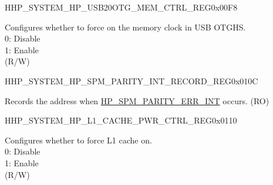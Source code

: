 \begin{register}{H}{HP\_SYSTEM\_HP\_USB20OTG\_MEM\_CTRL\_REG}{0x00F8}\label{regdesc:HPSYSTEMHPUSB20OTGMEMCTRLREG}
%
%
\regnewline%
\begin{regdesc}\begin{reglist}
\label{fielddesc:HPSYSTEMUSB20MEMCLKFORCEON}\item [HP\_SYSTEM\_USB20\_MEM\_CLK\_FORCE\_ON] Configures whether to force on the memory clock in USB OTGHS. \\
0: Disable\\
1: Enable\\
(R/W)
\end{reglist}\end{regdesc}
\end{register}


\begin{register}{H}{HP\_SYSTEM\_HP\_SPM\_PARITY\_INT\_RECORD\_REG}{0x010C}\label{regdesc:HPSYSTEMHPSPMPARITYINTRECORDREG}
%
%
\regnewline%
\begin{regdesc}\begin{reglist}
\label{fielddesc:HPSYSTEMHPSPMPARITYERRINTADDR}\item [HP\_SYSTEM\_HP\_SPM\_PARITY\_ERR\_INT\_ADDR] Records the address when \hyperref[tab:sysreg-int-sources]{HP\_SPM\_PARITY\_ERR\_INT} occurs. (RO)
\end{reglist}\end{regdesc}
\end{register}


\begin{register}{H}{HP\_SYSTEM\_HP\_L1\_CACHE\_PWR\_CTRL\_REG}{0x0110}\label{regdesc:HPSYSTEMHPL1CACHEPWRCTRLREG}
%
%
\regnewline%
\begin{regdesc}\begin{reglist}
\label{fielddesc:HPSYSTEML1CACHEMEMFO}\item [HP\_SYSTEM\_L1\_CACHE\_MEM\_FO] Configures whether to force L1 cache on.\\
0: Disable\\
1: Enable\\
(R/W)
\end{reglist}\end{regdesc}
\end{register}


